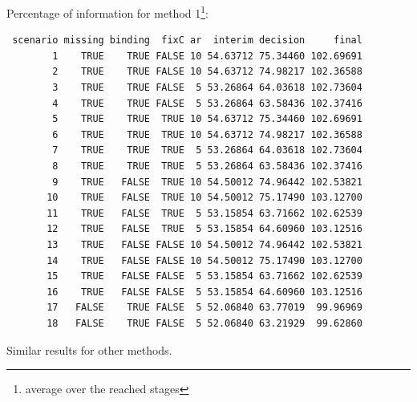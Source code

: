 \documentclass[12pt]{article}
\begin{document}
Percentage of information for method 1\footnote{average over the reached stages}:
\begin{verbatim}
 scenario missing binding  fixC ar  interim decision     final
        1    TRUE    TRUE FALSE 10 54.63712 75.34460 102.69691
        2    TRUE    TRUE FALSE 10 54.63712 74.98217 102.36588
        3    TRUE    TRUE FALSE  5 53.26864 64.03618 102.73604
        4    TRUE    TRUE FALSE  5 53.26864 63.58436 102.37416
        5    TRUE    TRUE  TRUE 10 54.63712 75.34460 102.69691
        6    TRUE    TRUE  TRUE 10 54.63712 74.98217 102.36588
        7    TRUE    TRUE  TRUE  5 53.26864 64.03618 102.73604
        8    TRUE    TRUE  TRUE  5 53.26864 63.58436 102.37416
        9    TRUE   FALSE  TRUE 10 54.50012 74.96442 102.53821
       10    TRUE   FALSE  TRUE 10 54.50012 75.17490 103.12700
       11    TRUE   FALSE  TRUE  5 53.15854 63.71662 102.62539
       12    TRUE   FALSE  TRUE  5 53.15854 64.60960 103.12516
       13    TRUE   FALSE FALSE 10 54.50012 74.96442 102.53821
       14    TRUE   FALSE FALSE 10 54.50012 75.17490 103.12700
       15    TRUE   FALSE FALSE  5 53.15854 63.71662 102.62539
       16    TRUE   FALSE FALSE  5 53.15854 64.60960 103.12516
       17   FALSE    TRUE FALSE  5 52.06840 63.77019  99.96969
       18   FALSE    TRUE FALSE  5 52.06840 63.21929  99.62860
\end{verbatim}

Similar results for other methods.
\end{document}
